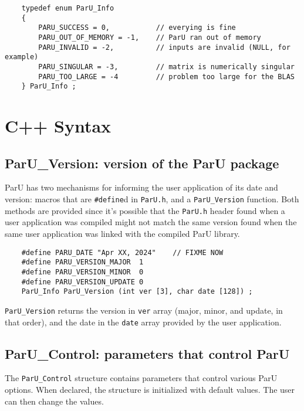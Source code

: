 \documentclass[12pt]{article}
\begin{document}
    {\footnotesize
    \begin{verbatim}
    typedef enum ParU_Info
    {
        PARU_SUCCESS = 0,           // everying is fine
        PARU_OUT_OF_MEMORY = -1,    // ParU ran out of memory
        PARU_INVALID = -2,          // inputs are invalid (NULL, for example)
        PARU_SINGULAR = -3,         // matrix is numerically singular
        PARU_TOO_LARGE = -4         // problem too large for the BLAS
    } ParU_Info ; \end{verbatim}}

\section{C++ Syntax}

\subsection{{\sf ParU\_Version}: version of the ParU package}

    ParU has two mechanisms for informing the user application of its date and
    version: macros that are \verb'#define'd in \verb'ParU.h', and a
    \verb'ParU_Version' function.  Both methods are provided since it's
    possible that the \verb'ParU.h' header found when a user application was
    compiled might not match the same version found when the same user
    application was linked with the compiled ParU library.

    {\footnotesize
    \begin{verbatim}
    #define PARU_DATE "Apr XX, 2024"    // FIXME NOW
    #define PARU_VERSION_MAJOR  1
    #define PARU_VERSION_MINOR  0
    #define PARU_VERSION_UPDATE 0
    ParU_Info ParU_Version (int ver [3], char date [128]) ; \end{verbatim}}

    \verb'ParU_Version' returns the version in \verb'ver' array (major, minor,
    and update, in that order), and the date in the \verb'date' array provided
    by the user application.

\subsection{{\sf ParU\_Control}: parameters that control ParU}

    The \verb'ParU_Control' structure contains parameters that control various
    ParU options.  When declared, the structure is initialized with default
    values.  The user can then change the values.
\end{document}
